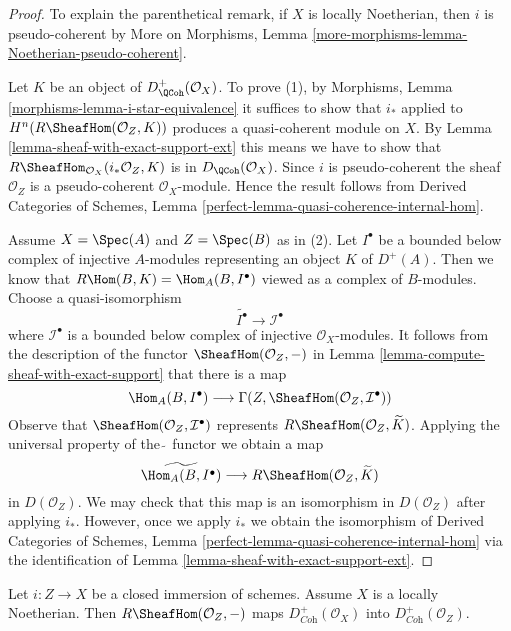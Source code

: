 \begin{proof}
To explain the parenthetical remark, if $X$ is locally Noetherian, then
$i$ is pseudo-coherent by
More on Morphisms, Lemma \ref{more-morphisms-lemma-Noetherian-pseudo-coherent}.

\medskip\noindent
Let $K$ be an object of $D^+_\QCoh(\mathcal{O}_X)$. To prove (1), by
Morphisms, Lemma \ref{morphisms-lemma-i-star-equivalence}
it suffices to show that $i_*$ applied to
$H^n(R\SheafHom(\mathcal{O}_Z, K))$ produces a
quasi-coherent module on $X$. By
Lemma \ref{lemma-sheaf-with-exact-support-ext}
this means we have to show that
$R\SheafHom_{\mathcal{O}_X}(i_*\mathcal{O}_Z, K)$
is in $D_\QCoh(\mathcal{O}_X)$. Since $i$ is pseudo-coherent
the sheaf $\mathcal{O}_Z$ is a pseudo-coherent $\mathcal{O}_X$-module.
Hence the result follows from
Derived Categories of Schemes, Lemma
\ref{perfect-lemma-quasi-coherence-internal-hom}.

\medskip\noindent
Assume $X = \Spec(A)$ and $Z = \Spec(B)$ as in (2).
Let $I^\bullet$ be a bounded below complex of injective $A$-modules
representing an object $K$ of $D^+(A)$.
Then we know that $R\Hom(B, K) = \Hom_A(B, I^\bullet)$ viewed
as a complex of $B$-modules. Choose a quasi-isomorphism
$$
\widetilde{I^\bullet} \longrightarrow \mathcal{I}^\bullet
$$
where $\mathcal{I}^\bullet$ is a bounded below complex of injective
$\mathcal{O}_X$-modules. It follows from the description of
the functor $\SheafHom(\mathcal{O}_Z, -)$ in
Lemma \ref{lemma-compute-sheaf-with-exact-support}
that there is a map
$$
\Hom_A(B, I^\bullet)
\longrightarrow
\Gamma(Z, \SheafHom(\mathcal{O}_Z, \mathcal{I}^\bullet))
$$
Observe that $\SheafHom(\mathcal{O}_Z, \mathcal{I}^\bullet)$
represents $R\SheafHom(\mathcal{O}_Z, \widetilde{K})$.
Applying the universal property of the $\widetilde{\ }$ functor we
obtain a map
$$
\widetilde{\Hom_A(B, I^\bullet)}
\longrightarrow
R\SheafHom(\mathcal{O}_Z, \widetilde{K})
$$
in $D(\mathcal{O}_Z)$. We may check that this map is an isomorphism in
$D(\mathcal{O}_Z)$ after applying $i_*$. However, once we apply
$i_*$ we obtain the isomorphism of Derived Categories of Schemes,
Lemma \ref{perfect-lemma-quasi-coherence-internal-hom}
via the identification of
Lemma \ref{lemma-sheaf-with-exact-support-ext}.
\end{proof}

\begin{lemma}
\label{lemma-sheaf-with-exact-support-coherent}
Let $i : Z \to X$ be a closed immersion of schemes.
Assume $X$ is a locally Noetherian.
Then $R\SheafHom(\mathcal{O}_Z, -)$ maps $D^+_{\textit{Coh}}(\mathcal{O}_X)$
into $D^+_{\textit{Coh}}(\mathcal{O}_Z)$.
\end{lemma}

